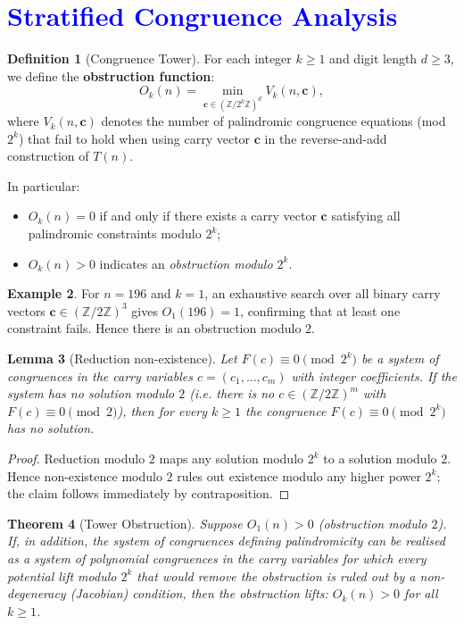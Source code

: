 \documentclass[11pt,a4paper]{article}
\theoremstyle{plain}
\newtheorem{theorem}{Theorem}[section]
\newtheorem{lemma}[theorem]{Lemma}
\theoremstyle{definition}
\newtheorem{definition}[theorem]{Definition}
\newtheorem{example}[theorem]{Example}
\begin{document}
\section{\textcolor{blue}{Stratified Congruence Analysis}}

\begin{definition}[Congruence Tower]
For each integer $k \ge 1$ and digit length $d \ge 3$, 
we define the \textbf{obstruction function}:
\[
O_k(n)
  = \min_{\mathbf{c} \in (\mathbb{Z}/2^k\mathbb{Z})^d}
     V_k(n, \mathbf{c}),
\]
where $V_k(n, \mathbf{c})$ denotes the number of palindromic 
congruence equations (mod $2^k$) that fail to hold when using
carry vector $\mathbf{c}$ in the reverse-and-add construction of $T(n)$.

In particular:
\begin{itemize}
\item $O_k(n) = 0$ if and only if there exists a carry vector 
$\mathbf{c}$ satisfying all palindromic constraints modulo $2^k$;
\item $O_k(n) > 0$ indicates an \emph{obstruction modulo $2^k$}.
\end{itemize}
\end{definition}

\begin{example}
For $n = 196$ and $k=1$, an exhaustive search over all 
binary carry vectors $\mathbf{c} \in (\mathbb{Z}/2\mathbb{Z})^3$
gives $O_1(196) = 1$, confirming that at least one constraint fails.
Hence there is an obstruction modulo $2$.
\end{example}

\begin{lemma}[Reduction non-existence]\label{lem:reduction_nonexist}
Let $F(c)\equiv 0\pmod{2^k}$ be a system of congruences in the carry variables $c=(c_1,\dots,c_m)$ with integer coefficients. If the system has no solution modulo $2$ (i.e. there is no $c\in(\mathbb Z/2\mathbb Z)^m$ with $F(c)\equiv0\pmod 2$), then for every $k\ge1$ the congruence $F(c)\equiv0\pmod{2^k}$ has no solution.
\end{lemma}

\begin{proof}
Reduction modulo $2$ maps any solution modulo $2^k$ to a solution modulo $2$. Hence non-existence modulo $2$ rules out existence modulo any higher power $2^k$; the claim follows immediately by contraposition.
\end{proof}

\begin{theorem}[Tower Obstruction]\label{thm:tower_obstruction}
Suppose $O_1(n) > 0$ (obstruction modulo $2$). If, in addition, the system of congruences defining palindromicity can be realised as a system of polynomial congruences in the carry variables for which every potential lift modulo $2^k$ that would remove the obstruction is ruled out by a non-degeneracy (Jacobian) condition, then the obstruction lifts: $O_k(n) > 0$ for all $k\ge 1$.
\end{theorem}
\end{document}
